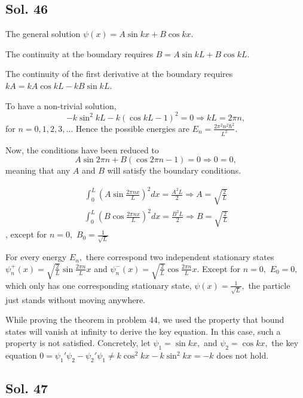     \subsection*{Sol. 46}
    The general solution $\psi(x)=A\sin kx+B\cos kx.$ 
    
    The continuity at the boundary requires $B=A\sin kL + B\cos kL.$

    The continuity of the first derivative at the boundary requires $kA=kA\cos kL - kB\sin kL.$

    To have a non-trivial solution, 
    $$
    -k\sin^2 kL - k(\cos kL -1)^2=0
    \Rightarrow kL=2\pi n,
    $$
    for $n=0,1,2,3,\dots$ Hence the possible energies are 
    $E_n=\frac{2\pi^2n^2\hbar^2}{L^2}.$

    Now, the conditions have been reduced to 
    $$ 
    A\sin 2\pi n + B(\cos 2\pi n - 1)=0 \Rightarrow 0=0,
    $$
    meaning that any $A$ and $B$ will satisfy the boundary conditions.
    

    \begin{align*}
        \int_0^L
        (A\sin \frac{2\pi n x}{L})^2dx = \frac{A^2L}{2}
        \Rightarrow A=
        \sqrt{\frac{2}{L}}
    \end{align*}
    \begin{align*}
        \int_0^L
        (B\cos \frac{2\pi nx}{L})^2dx = \frac{B^2L}{2}
        \Rightarrow B=
        \sqrt{\frac{2}{L}}
    \end{align*},
except for $n=0,$ $B_0=\frac{1}{\sqrt{L}}$
    

    For every energy $E_n,$ there correspond two independent stationary states $\psi_n^+(x)=\sqrt{\frac{2}{L}}\sin \frac{2\pi n}{L}x$ and 
    $\psi_n^-(x)=\sqrt{\frac{2}{L}}\cos \frac{2\pi n}{L}x.$ 
    Except for $n=0,$ $E_0=0,$ which only has one 
    corresponding stationary state, $\psi(x)=\frac{1}{\sqrt{L}},$ the particle just stands without moving anywhere.

    While proving the theorem in problem 44, we used the property that bound states will vanish at infinity to derive the key equation. In this case, such a property is not satisfied. Concretely, let $\psi_1=\sin kx,$ and $\psi_2=\cos kx,$ 
    the key equation 
    $0=\psi_1'\psi_2-\psi_2'\psi_1\neq k\cos^2 kx-k\sin^2 kx=-k$
    does not hold.


\subsection*{Sol. 47}

